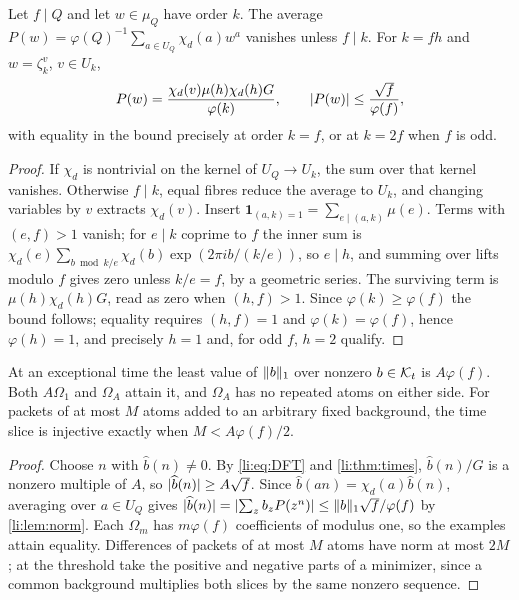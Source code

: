 \begin{lemma}\label{li:lem:norm}
Let $f\mid Q$ and let $w\in\mu_Q$ have order $k$. The average $P(w)=\varphi(Q)^{-1}\sum_{a\in U_Q}\chi_d(a)w^a$ vanishes unless $f\mid k$.
For $k=fh$ and $w=\zeta_k^v$, $v\in U_k$,
\begin{equation}\label{li:eq:projection}
 P(w)=\frac{\chi_d(v)\mu(h)\chi_d(h)G}{\varphi(k)},\qquad\lvert P(w)\rvert\le\frac{\sqrt f}{\varphi(f)},
\end{equation}
with equality in the bound precisely at order $k=f$, or at $k=2f$ when $f$ is odd.
\end{lemma}

\begin{proof}
If $\chi_d$ is nontrivial on the kernel of $U_Q\to U_k$, the sum over that kernel vanishes. Otherwise $f\mid k$, equal
fibres reduce the average to $U_k$, and changing variables by $v$ extracts $\chi_d(v)$. Insert
$\mathbf 1_{(a,k)=1}=\sum_{e\mid(a,k)}\mu(e)$. Terms with $(e,f)>1$ vanish; for $e\mid k$ coprime to $f$ the inner sum is
$\chi_d(e)\sum_{b\bmod k/e}\chi_d(b)\exp(2\pi ib/(k/e))$, so $e\mid h$, and summing over lifts modulo $f$ gives zero unless $k/e=f$,
by a geometric series. The surviving term is $\mu(h)\chi_d(h)G$, read as zero when $(h,f)>1$. Since $\varphi(k)\ge\varphi(f)$
the bound follows; equality requires $(h,f)=1$ and $\varphi(k)=\varphi(f)$, hence $\varphi(h)=1$, and precisely $h=1$ and, for odd
$f$, $h=2$ qualify.
\end{proof}

\begin{theorem}\label{li:thm:dist}
At an exceptional time the least value of $\lVert b\rVert_1$ over nonzero $b\in\mathcal{K}_t$ is $A\varphi(f)$. Both $A\Omega_1$ and $\Omega_A$
attain it, and $\Omega_A$ has no repeated atoms on either side. For packets of at most $M$ atoms added to an
arbitrary fixed background, the time slice is injective exactly when $M<A\varphi(f)/2$.
\end{theorem}

\begin{proof}
Choose $n$ with $\widehat b(n)\ne0$. By \eqref{li:eq:DFT} and \cref{li:thm:times}, $\widehat b(n)/G$ is a nonzero multiple of $A$, so
$\lvert\widehat b(n)\rvert\ge A\sqrt f$. Since $\widehat b(an)=\chi_d(a)\widehat b(n)$, averaging over $a\in U_Q$ gives
$\lvert\widehat b(n)\rvert=\lvert\sum_zb_zP(z^n)\rvert\le\lVert b\rVert_1\sqrt f/\varphi(f)$ by \cref{li:lem:norm}. Each $\Omega_m$ has $m\varphi(f)$ coefficients of
modulus one, so the examples attain equality. Differences of packets of at most $M$ atoms have norm at most
$2M$; at the threshold take the positive and negative parts of a minimizer, since a common background multiplies
both slices by the same nonzero sequence.
\end{proof}

